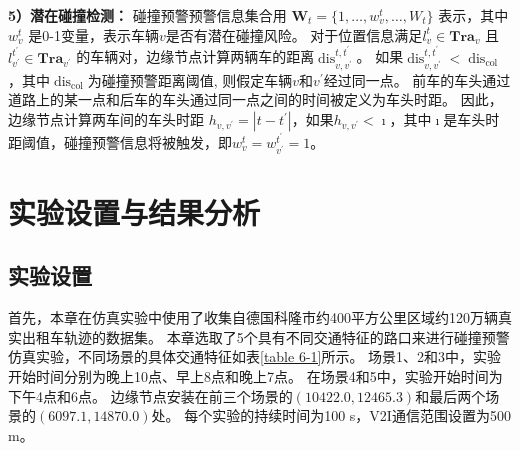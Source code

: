 \textbf{5）潜在碰撞检测：}
碰撞预警预警信息集合用 $\mathbf{W}_t = \{ 1, \ldots, w_{v}^{t}, \ldots, W_t\}$ 表示，其中 $w_{v}^{t}$ 是0-1变量，表示车辆$v$是否有潜在碰撞风险。
对于位置信息满足$l_v^t \in \mathbf{Tra}_{v}$ 且 $l_{v^{\prime}}^{t^{\prime}} \in \mathbf{Tra}_{v^{\prime}}$ 的车辆对，边缘节点计算两辆车的距离$\operatorname{dis}_{v, v^{\prime}}^{t, t^{\prime}}$。
如果$\operatorname{dis}_{v, v^{\prime}}^{t, t^{\prime}} < \operatorname{dis}_{\operatorname{col}}$，其中$\operatorname{dis}_{\operatorname{col}}$为碰撞预警距离阈值, 则假定车辆$v$和$v^{\prime}$经过同一点。
前车的车头通过道路上的某一点和后车的车头通过同一点之间的时间被定义为车头时距\cite{vogel2003comparison}。
因此，边缘节点计算两车间的车头时距 ${h}_{v, v^{\prime}} = |t - t^{\prime}|$，如果${h}_{v, v^{\prime}} < \imath$，其中$\imath$是车头时距阈值，碰撞预警信息将被触发，即$w_{v}^{t} = w_{v^{\prime}}^{t^{\prime}} = 1$。

\section{实验设置与结果分析}\label{section 5-4}

\subsection{实验设置}

首先，本章在仿真实验中使用了收集自德国科隆市约400平方公里区域约120万辆真实出租车轨迹的数据集\cite{uppoor2013generation}。
本章选取了5个具有不同交通特征的路口来进行碰撞预警仿真实验，不同场景的具体交通特征如表\ref{table 6-1}所示。
场景1、2和3中，实验开始时间分别为晚上10点、早上8点和晚上7点。
在场景4和5中，实验开始时间为下午4点和6点。
边缘节点安装在前三个场景的$(10422.0, 12465.3)$和最后两个场景的$(6097.1, 14870.0)$处。
每个实验的持续时间为100 s，V2I通信范围设置为500 m。

\begin{table}[h]\small
{} %
\centering
{}
\label{table 6-1}
\end{table}

